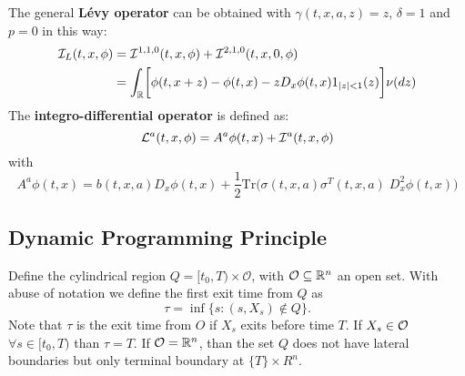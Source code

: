 \noindent
The general \textbf{Lévy operator} can be obtained with $\gamma(t,x,a,z) = z$, $\delta = 1$ and $p=0$ in this way:
\begin{align*}
\mathcal{I}_L(t,x,\phi) &= \mathcal{I}^{1,1,0}(t,x,\phi) + \mathcal{I}^{2,1,0}(t,x,0,\phi)\\  
                   &= \int_{\mathbb{R}} \biggl[ \phi(t,x+ z) - \phi(t,x) - z D_x \phi(t,x) 1_{|z|<1}(z) \biggr] \nu(dz) 
\end{align*}
The \textbf{integro-differential operator} is defined as:
\begin{equation}\label{int_diff_oper}
 \mathcal{L}^{a}(t,x,\phi) = A^{a} \phi(t,x) + \mathcal{I}^{a}(t,x,\phi)
\end{equation}
with 
$$A^{a} \phi(t,x) = b(t,x,a) D_x \phi(t,x) + \frac{1}{2} \mbox{Tr} \biggl( \sigma(t,x,a)\sigma^T(t,x,a) \; D_x^2 \phi(t,x) \biggr) $$

\subsection{Dynamic Programming Principle}

Define the cylindrical region $Q = [t_0,T) \times \mathcal{O}$, with $\mathcal{O} \subseteq \mathbb{R}^n$ an open set. With abuse of notation we define the first exit time from $Q$ as 
\begin{equation}\label{exit_time_def}
 \tau = \inf \{ s: (s,X_s) \not\in Q \}. 
\end{equation}
Note that $\tau$ is the exit time from $O$ if $X_s$ exits before time $T$. If $X_s \in \mathcal{O}$ $\forall s \in [t_0,T)$ than $\tau = T$. If $\mathcal{O} = \mathbb{R}^n$, than the set $Q$ 
does not have lateral boundaries but only terminal boundary at $\{ T \} \times R^n$.

